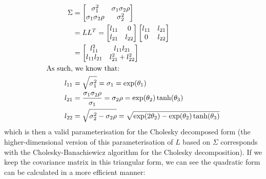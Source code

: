 \documentclass[a4paper, 12pt]{report}
\begin{document}
\begin{align*}
	\Sigma &= \begin{bmatrix}
 \sigma_1^2 & \sigma_1\sigma_2\rho \\
  \sigma_1\sigma_2\rho & \sigma_2^2 \\
\end{bmatrix}\\
&= LL^T = \begin{bmatrix}
 l_{11} & 0 \\
  l_{21} & l_{22} \\
\end{bmatrix}\begin{bmatrix}
 l_{11} & l_{21} \\
  0 & l_{22} \\
\end{bmatrix}\\
&=\begin{bmatrix}
 l_{11}^2 & l_{11}l_{21} \\
  l_{11}l_{21} & l_{21}^2 + l_{22}^2 \\
\end{bmatrix}\hspace{0.5cm}\\
\textrm{As such,}&\textrm{ we know that:}\\
	l_{11} &= \sqrt{\sigma_1^2} =\sigma_1=\exp(\theta_1)\\
	l_{21} &= \frac{\sigma_1\sigma_2\rho}{\sigma_1}=\sigma_2\rho=\exp(\theta_2)\tanh(\theta_3) \\
	l_{22} &= \sqrt{\sigma_2^2 - \sigma_2\rho} = \sqrt{\exp(2\theta_2)-\exp(\theta_2)\tanh(\theta_3)}
\end{align*}
which is then a valid parameterisation for the Cholesky decomposed form  (the higher-dimensional version of this parameterisation of $L$ based on $\Sigma$ corresponds with the Cholesky-Banachiewicz algorithm for the Cholesky decomposition). If we keep the covariance matrix in this triangular form, we can see the quadratic form can be calculated in a more efficient manner:
\end{document}
